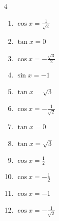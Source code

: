 \begin{multicols}{4}
\begin{enumerate}
  \item $\displaystyle \cos{x}  = \frac{1}{\sqrt{2}}$


  \item $\displaystyle \tan{x}  = 0$

        \phantom{$\displaystyle x = 0 , \pi$}

  \item $\displaystyle \cos{x}  = -\frac{\sqrt{3}}{2}$


  \item $\displaystyle \sin{x}  = -1$


  \item $\displaystyle \tan{x}  = \sqrt{3}$


  \item $\displaystyle \cos{x}  = -\frac{1}{\sqrt{2}}$


  \item $\displaystyle \tan{x}  = 0$

        \phantom{$\displaystyle x = 0 , \pi$}

  \item $\displaystyle \tan{x}  = \sqrt{3}$


  \item $\displaystyle \cos{x}  = \frac{1}{2}$


  \item $\displaystyle \cos{x}  = -\frac{1}{2}$


  \item $\displaystyle \cos{x}  = -1$

        \phantom{$\displaystyle x = \pi$}

  \item $\displaystyle \cos{x}  = -\frac{1}{\sqrt{2}}$


\end{enumerate}
\end{multicols}
